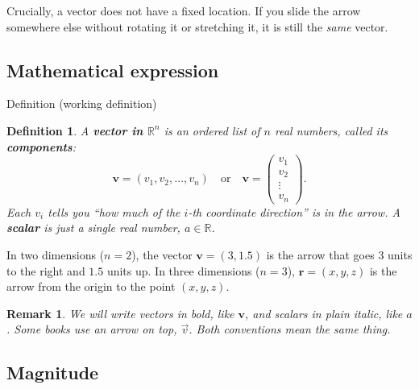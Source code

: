 \documentclass[11pt,a4paper]{article}
\newtheorem{definition}[theorem]{Definition}
\newtheorem{remark}[theorem]{Remark}
\newcommand{\vect}[1]{\boldsymbol{#1}}
\begin{document}
\begin{center}
\end{center}

Crucially, a vector does not have a fixed location.
If you slide the arrow somewhere else without rotating it or stretching it,
it is still the \emph{same} vector.

\subsection*{Mathematical expression}

\begin{mathblock}{Definition (working definition)}
\begin{definition}
A \textbf{vector in $\mathbb{R}^n$} is an ordered list of $n$ real numbers,
called its \textbf{components}:
\[
  \vect{v} = (v_1, v_2, \dots, v_n)
  \quad\text{or}\quad
  \vect{v} = \begin{pmatrix} v_1 \\ v_2 \\ \vdots \\ v_n \end{pmatrix}.
\]
Each $v_i$ tells you ``how much of the $i$-th coordinate direction'' is in the arrow.
A \textbf{scalar} is just a single real number, $a \in \mathbb{R}$.
\end{definition}
\end{mathblock}

In two dimensions ($n=2$), the vector $\vect{v} = (3, 1.5)$ is the arrow that goes
$3$ units to the right and $1.5$ units up. In three dimensions ($n=3$),
$\vect{r} = (x, y, z)$ is the arrow from the origin to the point $(x,y,z)$.

\begin{remark}
We will write vectors in bold, like $\vect{v}$, and scalars in plain italic, like $a$.
Some books use an arrow on top, $\vec{v}$. Both conventions mean the same thing.
\end{remark}

\subsection*{Magnitude}
\end{document}
